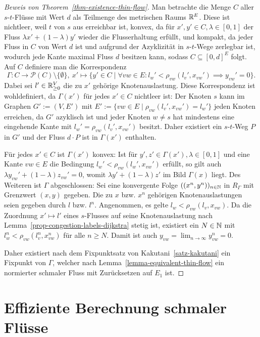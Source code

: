 \begin{proof}[Beweis von Theorem~\ref{thm-existence-thin-flow}]
	Man betrachte die Menge $C$ aller $s$-$t$-Flüsse mit Wert $d$ als Teilmenge des metrischen Raums $\mathbb{R}^E$.
	Diese ist nichtleer, weil $t$ von $s$ aus erreichbar ist, konvex, da für $x', y'\in C, \lambda \in [0,1]$ der Fluss $\lambda x' + (1-\lambda)y'$ wieder die Flusserhaltung erfüllt, und kompakt, da jeder Fluss in $C$ von Wert $d$ ist und aufgrund der Azyklizität in $s$-$t$-Wege zerlegbar ist, wodurch jede Kante maximal Fluss $d$ besitzen kann, sodass $C\subseteq [0, d]^E$ folgt.
	Auf $C$ definiere man die Korrespondenz
	\[
	\Gamma: C\to \mathcal{P}(C)\setminus\{ \emptyset \}, ~ x'\mapsto \{ y'\in C \mid \forall vw\in E: l_w' < \rho_{vw}(l_v', x_{vw}') \implies y_{vw}' = 0 \}.
	\]
	Dabei sei $l'\in\mathbb{R}_{\geq 0}^V$ die zu $x'$ gehörige Knotenauslastung.
	Diese Korrespondenz ist wohldefiniert, da $\Gamma(x')$ für jedes $x'\in C$ nichtleer ist:
	Der Knoten $s$ kann im Graphen $G':= (V, E')$ mit $E':= \{ vw\in E \mid \rho_{vw}(l_v', x_{vw}')=l_w' \}$ jeden Knoten erreichen, da $G'$ azyklisch ist und jeder Knoten $w\neq s$ hat mindestens eine eingehende Kante mit $l_w' = \rho_{vw}(l_v', x_{vw}')$ besitzt. 
	Daher existiert ein $s$-$t$-Weg $P$ in $G'$ und der Fluss $d\cdot P$ ist in $\Gamma(x')$ enthalten.
	
	Für jedes $x'\in C$ ist $\Gamma(x')$ konvex: Ist für $y', z'\in \Gamma(x'), \lambda\in [0,1]$ und eine Kante $vw\in E$ die Bedingung $l_w' < \rho_{vw}(l_w', x_{vw}')$ erfüllt, so gilt auch $\lambda y_{vw}' + (1-\lambda) z_{vw}' = 0$, womit $\lambda y' + (1-\lambda)z'$ im Bild $\Gamma(x)$ liegt.
	Des Weiteren ist $\Gamma$ abgeschlossen: 
	Sei eine konvergente Folge $((x^{n}, y^{n}))_{n\in\mathbb{N}}$ in $R_\Gamma$ mit Grenzwert $(x, y)$ gegeben.
	Die zu $x$ bzw. $x^n$ gehörigen Knotenauslastungen seien gegeben durch $l$ bzw. $l^n$. 
	Angenommen, es gelte $l_w < \rho_{vw}(l_v, x_{vw})$.
	Da die Zuordnung $x'\mapsto l'$ eines $s$-Flusses auf seine Knotenauslastung nach Lemma~\ref{prop-congestion-labels-dijkstra} stetig ist, existiert ein $N\in\mathbb{N}$ mit $l_w^n<\rho_{vw}(l_v^n, x_{vw}^n)$ für alle $n\geq N$.
	Damit ist auch $y_{vw} = \lim_{n\to\infty} y_{vw}^n = 0$.
	
	Daher existiert nach dem Fixpunktsatz von Kakutani~\ref{satz-kakutani} ein Fixpunkt von $\Gamma$, welcher nach Lemma~\ref{lemma-equivalent-thin-flow} ein normierter schmaler Fluss mit Zurücksetzen auf $E_1$ ist.
\end{proof}

\section{Effiziente Berechnung schmaler Flüsse}

